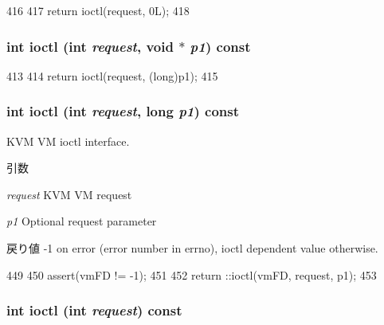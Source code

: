 \begin{DoxyCode}
416                                  {
417         return ioctl(request, 0L);
418     }
\end{DoxyCode}
\hypertarget{group__KvmIoctl_ga89db87cb31fe2ba732de8fa68c8bd1f1}{
\subsubsection[{ioctl}]{\setlength{\rightskip}{0pt plus 5cm}int ioctl (int {\em request}, \/  void $\ast$ {\em p1}) const}}
\label{group__KvmIoctl_ga89db87cb31fe2ba732de8fa68c8bd1f1}



\begin{DoxyCode}
413                                            {
414         return ioctl(request, (long)p1);
415     }
\end{DoxyCode}
\hypertarget{group__KvmIoctl_ga106fe09b5e87d6c14884f8ffff7b338a}{
\subsubsection[{ioctl}]{\setlength{\rightskip}{0pt plus 5cm}int ioctl (int {\em request}, \/  long {\em p1}) const}}
\label{group__KvmIoctl_ga106fe09b5e87d6c14884f8ffff7b338a}
KVM VM ioctl interface.


\begin{DoxyParams}{引数}
\item[{\em request}]KVM VM request \item[{\em p1}]Optional request parameter\end{DoxyParams}
\begin{DoxyReturn}{戻り値}
-\/1 on error (error number in errno), ioctl dependent value otherwise. 
\end{DoxyReturn}



\begin{DoxyCode}
449 {
450     assert(vmFD != -1);
451 
452     return ::ioctl(vmFD, request, p1);
453 }
\end{DoxyCode}
\hypertarget{group__KvmIoctl_ga32cd3b0742689c29c9ab9e3e03feb5f2}{
\subsubsection[{ioctl}]{\setlength{\rightskip}{0pt plus 5cm}int ioctl (int {\em request}) const}}
\label{group__KvmIoctl_ga32cd3b0742689c29c9ab9e3e03feb5f2}



